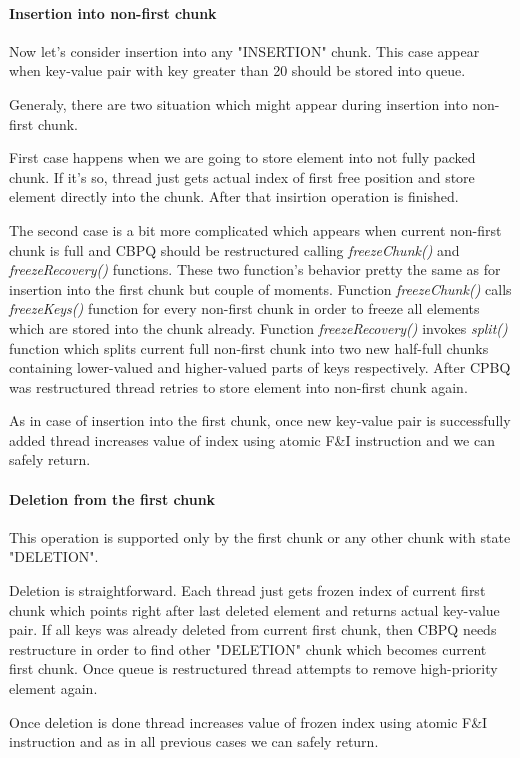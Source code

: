 \documentclass{article}
\begin{document}
\paragraph{Insertion into non-first chunk}\mbox{}\par
Now let's consider insertion into any "INSERTION" chunk. This case appear when key-value pair with key greater than 20 should be stored into queue.\par
Generaly, there are two situation which might appear during insertion into non-first chunk.\par
First case happens when we are going to store element into not fully packed chunk. If it's so, thread just gets actual index of first free position and store element directly into the chunk. After that insirtion operation is finished.\par
The second case is a bit more complicated which appears when current non-first chunk is full and CBPQ should be restructured calling \textit{freezeChunk()} and \textit{freezeRecovery()} functions. These two function's behavior pretty the same as for insertion into the first chunk but couple of moments. Function \textit{freezeChunk()} calls \textit{freezeKeys()} function for every non-first chunk in order to freeze all elements which are stored into the chunk already. Function \textit{freezeRecovery()} invokes \textit{split()} function which splits current full non-first chunk into two new half-full chunks containing lower-valued and higher-valued parts of keys respectively. After CPBQ was restructured thread retries to store element into non-first chunk again.\par
As in case of insertion into the first chunk, once new key-value pair is successfully added thread increases value of index using atomic F\&I instruction and we can safely return.

\paragraph{Deletion from the first chunk}\mbox{}\par
This operation is supported only by the first chunk or any other chunk with state "DELETION".\par
Deletion is straightforward. Each thread just gets frozen index of current first chunk which points right after last deleted element and returns actual key-value pair. If all keys was already deleted from current first chunk, then CBPQ needs restructure in order to find other "DELETION" chunk which becomes current first chunk. Once queue is restructured thread attempts to remove high-priority element again.\par
Once deletion is done thread increases value of frozen index using atomic F\&I instruction and as in all previous cases we can safely return.
\end{document}

